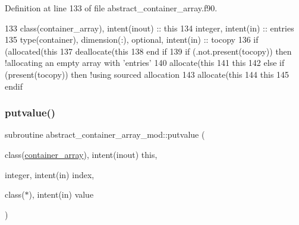 Definition at line 133 of file abstract\+\_\+container\+\_\+array.\+f90.


\begin{DoxyCode}
133     \textcolor{keywordtype}{class}(container\_array), \textcolor{keywordtype}{intent(inout)} :: this
134     \textcolor{keywordtype}{integer}, \textcolor{keywordtype}{intent(in)} :: entries
135     \textcolor{keywordtype}{type}(container), \textcolor{keywordtype}{dimension(:)}, \textcolor{keywordtype}{optional}, \textcolor{keywordtype}{intent(in)} :: tocopy
136     \textcolor{keywordflow}{if} (\textcolor{keyword}{allocated}(this%
137         \textcolor{keyword}{deallocate}(this%
138 \textcolor{keywordflow}{    end if}
139     \textcolor{keywordflow}{if} (.not.\textcolor{keyword}{present}(tocopy)) \textcolor{keywordflow}{then} \textcolor{comment}{!allocating an empty array with 'entries'}
140         \textcolor{keyword}{allocate}(this%
141         this%
142     \textcolor{keywordflow}{else} \textcolor{keywordflow}{if} (\textcolor{keyword}{present}(tocopy)) \textcolor{keywordflow}{then} \textcolor{comment}{!using sourced allocation}
143       \textcolor{keyword}{allocate}(this%
144       this%
145 \textcolor{keywordflow}{    endif}
\end{DoxyCode}
\mbox{\label{namespaceabstract__container__array__mod_aae1f6309c51e282a528ce78f128443e0}} 
\subsubsection{\texorpdfstring{putvalue()}{putvalue()}}
{\footnotesize\ttfamily subroutine abstract\+\_\+container\+\_\+array\+\_\+mod\+::putvalue (\begin{DoxyParamCaption}\item[{class(\mbox{\hyperlink{structabstract__container__array__mod_1_1container__array}{container\+\_\+array}}), intent(inout)}]{this,  }\item[{integer, intent(in)}]{index,  }\item[{class($\ast$), intent(in)}]{value }\end{DoxyParamCaption})\hspace{0.3cm}{\ttfamily [private]}}



